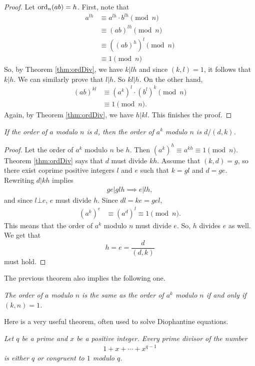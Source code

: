 \documentclass{subfile}
\begin{document}
	\begin{proof}
		Let $\operatorname{ord}_n(ab)=h$. First, note that
			\begin{align*}
				a^{lh}
					& \equiv a^{lh}\cdot b^{lh}\pmod{n}\\
					& \equiv (ab)^{lh}\pmod{n}\\
					& \equiv \left((ab)^h\right)^l\pmod{n}\\
					& \equiv 1 \pmod n
			\end{align*}
		So, by Theorem \ref{thm:ordDiv}, we have $k|lh$ and since $(k,l)=1$, it follows that $k|h$. We can similarly prove that $l|h$. So $kl|h$. On the other hand,
			\begin{align*}
				(ab)^{kl}
					& \equiv (a^k)^l \cdot (b^l)^k\pmod{n}\\
					& \equiv 1 \pmod n.
			\end{align*}
		Again, by Theorem \eqref{thm:ordDiv}, we have $h|kl$. This finishes the proof.
	\end{proof}

	\begin{theorem}\slshape
		If the order of $a$ modulo $n$ is $d$, then the order of $a^k$ modulo $n$ is $d/{(d,k)}$.
	\end{theorem}

	\begin{proof}
		Let the order of $a^k$ modulo $n$ be $h$. Then $\left(a^k\right)^h \equiv a^{kh} \equiv 1\pmod n$. Theorem \ref{thm:ordDiv} says that $d$ must divide $kh$. Assume that $(k,d)=g$, so there exist coprime positive integers $l$ and $e$ such that $k=gl$ and $d=ge$. Rewriting $d | kh$ implies
			\begin{align*}
				ge|glh \implies e|lh,
			\end{align*}
		and since $l\bot e$, $e$ must divide $h$. Since $dl=ke=gel$,
			\begin{align*}
				\left(a^k\right)^{e} & \equiv \left(a^d\right)^{l} \equiv 1\pmod n.
			\end{align*}
		This means that the order of $a^k$ modulo $n$ must divide $e$. So, $h$ divides $e$ as well. We get that $$h=e=\dfrac{d}{(d,k)}$$ must hold.
	\end{proof}
The previous theorem also implies the following one.
	\begin{theorem}\slshape
		The order of $a$ modulo $n$ is the same as the order of $a^k$ modulo $n$ if and only if $(k,n)=1$.
	\end{theorem}
Here is a very useful theorem, often used to solve Diophantine equations.
	\begin{theorem}\label{thm:cyclodiv}\slshape
		Let $q$ be a prime and $x$ be a positive integer. Every prime divisor of the number
			\begin{align*}
				1+x+\cdots+x^{q-1}
			\end{align*}
		is either $q$ or congruent to $1$ modulo $q$.
	\end{theorem}
\end{document}
